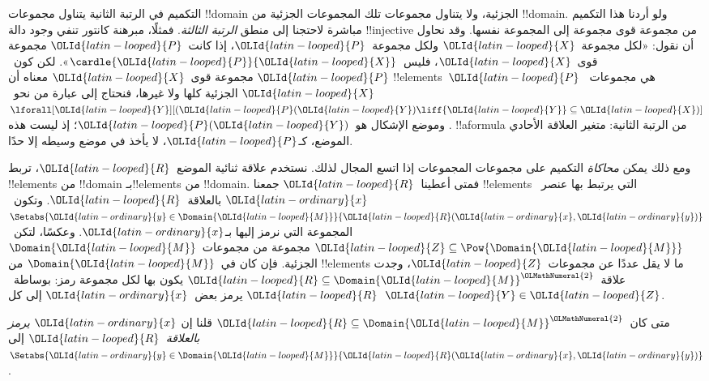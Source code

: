 \documentclass[../../../include/open-logic-section]{subfiles}
\begin{document}


\begin{explain}
التكميم في الرتبة الثانية يتناول مجموعات !!{domain} الجزئية،
ولا يتناول مجموعات تلك المجموعات الجزئية من !!{domain}.
ولو أردنا هذا التكميم مباشرة لاحتجنا إلى منطق \emph{الرتبة الثالثة}.
فمثلًا، مبرهنة كانتور تنفي وجود دالة !!{injective} من مجموعة
قوى مجموعة إلى المجموعة نفسها. وقد نحاول أن نقول:
«لكل مجموعة~${\OLId{latin-looped}{X}}$ ولكل مجموعة~${\OLId{latin-looped}{P}}$، إذا كانت~${\OLId{latin-looped}{P}}$ مجموعة
قوى~${\OLId{latin-looped}{X}}$، فليس~$\cardle{{\OLId{latin-looped}{P}}}{{\OLId{latin-looped}{X}}}$».
لكن كون~${\OLId{latin-looped}{P}}$ مجموعة قوى~${\OLId{latin-looped}{X}}$ معناه أن !!{element}s~${\OLId{latin-looped}{P}}$
هي مجموعات~${\OLId{latin-looped}{X}}$ الجزئية كلها ولا غيرها، فنحتاج إلى عبارة
من نحو~$\lforall[{\OLId{latin-looped}{Y}}][({\OLId{latin-looped}{P}}({\OLId{latin-looped}{Y}}) \liff {\OLId{latin-looped}{Y}} \subseteq {\OLId{latin-looped}{X}})]$.
وموضع الإشكال هو~${\OLId{latin-looped}{P}}({\OLId{latin-looped}{Y}})$؛ إذ ليست هذه !!a{formula} من الرتبة
الثانية: متغير العلاقة الأحادي الموضع، كـ${\OLId{latin-looped}{P}}$، لا يأخذ في موضع
وسيطه إلا حدًا.

ومع ذلك يمكن \emph{محاكاة} التكميم على مجموعات المجموعات
إذا اتسع المجال لذلك. نستخدم علاقة ثنائية الموضع~${\OLId{latin-looped}{R}}$،
تربط !!{element}s من !!{domain} بـ!!{element}s من !!{domain}.
فمتى أعطينا~${\OLId{latin-looped}{R}}$ جمعنا !!{element}s التي يرتبط بها عنصر~${\OLId{latin-ordinary}{x}}$
بالعلاقة~${\OLId{latin-looped}{R}}$. وتكون~$\Setabs{{\OLId{latin-ordinary}{y}} \in \Domain{{\OLId{latin-looped}{M}}}}{{\OLId{latin-looped}{R}}({\OLId{latin-ordinary}{x}},{\OLId{latin-ordinary}{y}})}$
المجموعة التي نرمز إليها بـ${\OLId{latin-ordinary}{x}}$.
وعكسًا، لتكن~${\OLId{latin-looped}{Z}} \subseteq \Pow{\Domain{{\OLId{latin-looped}{M}}}}$ مجموعة من
مجموعات~$\Domain{{\OLId{latin-looped}{M}}}$ الجزئية. فإن كان في~$\Domain{{\OLId{latin-looped}{M}}}$ من
!!{element}s ما لا يقل عددًا عن مجموعات~${\OLId{latin-looped}{Z}}$، وجدت
علاقة~${\OLId{latin-looped}{R}} \subseteq \Domain{{\OLId{latin-looped}{M}}}^{\OLMathNumeral{2}}$ يكون بها لكل مجموعة رمز:
بوساطة~${\OLId{latin-looped}{R}}$ يرمز بعض~${\OLId{latin-ordinary}{x}}$ إلى كل~${\OLId{latin-looped}{Y}} \in {\OLId{latin-looped}{Z}}$.
\end{explain}

\begin{defn}
متى كان~${\OLId{latin-looped}{R}} \subseteq \Domain{{\OLId{latin-looped}{M}}}^{\OLMathNumeral{2}}$ قلنا إن
\emph{${\OLId{latin-ordinary}{x}}$ يرمز بالعلاقة~${\OLId{latin-looped}{R}}$} إلى
$\Setabs{{\OLId{latin-ordinary}{y}} \in \Domain{{\OLId{latin-looped}{M}}}}{{\OLId{latin-looped}{R}}({\OLId{latin-ordinary}{x}}, {\OLId{latin-ordinary}{y}})}$.
\end{defn}
\end{document}
